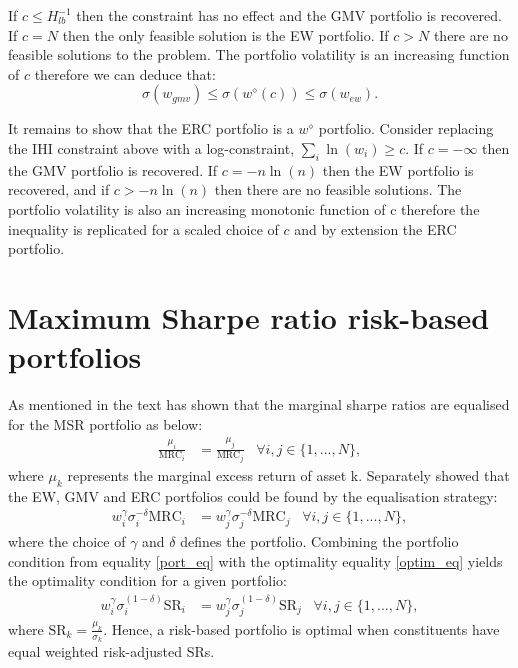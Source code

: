 \documentclass[a4paper,11pt,nocenter,bold,noupper,headcount]{mythesis}
\theoremstyle{plain}
\theoremstyle{definition}
\begin{document}
If $c \leq H^{-1}_{lb}$ then the constraint has no effect and the GMV portfolio is recovered. If $c = N$ then the only feasible solution is the EW portfolio. If $c > N$ there are no feasible solutions to the problem. The portfolio volatility is an increasing function of $c$ therefore we can deduce that: $$\sigma(w_{gmv}) \leq \sigma(w^\diamond(c)) \leq \sigma (w_{ew}).$$

It remains to show that the ERC portfolio is a $w^\diamond$ portfolio. Consider replacing the IHI constraint above with a log-constraint, $\sum_i \ln(w_i) \geq c$. If $c = - \infty$ then the GMV portfolio is recovered. If $c = -n \ln(n)$ then the EW portfolio is recovered, and if $c > -n\ln(n)$ then there are no feasible solutions. The portfolio volatility is also an increasing monotonic function of c therefore the inequality is replicated for a scaled choice of $c$ and by extension the ERC portfolio.
\section{Maximum Sharpe ratio risk-based portfolios} \label{msr_rb}

As mentioned in the text \cite{S07} has shown that the marginal sharpe ratios are equalised for the MSR portfolio as below:
\begin{align} \label{optim_eq}
\frac{\mu_i}{\text{MRC}_i} & = \frac{\mu_j}{\text{MRC}_j} \;\;\; \forall i, j \in \{1, ..., N \},
\end{align}
where $\mu_k$ represents the marginal excess return of asset k. Separately \cite{J13} showed that the EW, GMV and ERC portfolios could be found by the equalisation strategy:
\begin{align} \label{port_eq}
w_i^\gamma \sigma^{-\delta}_i \text{MRC}_i & = w_j^\gamma \sigma^{-\delta}_j \text{MRC}_j \;\;\; \forall i, j \in \{1, ..., N \},
\end{align}
where the choice of $\gamma$ and $\delta$ defines the portfolio. Combining the portfolio condition from equality \ref{port_eq} with the optimality equality \ref{optim_eq} yields the optimality condition for a given portfolio:
\begin{align}
w_i^\gamma \sigma_i^{(1- \delta)} \text{SR}_i & = w_j^\gamma \sigma_j^{(1- \delta)} \text{SR}_j \;\;\; \forall i, j \in \{1, ..., N \},
\end{align}
where $\text{SR}_k = \frac{\mu_k}{\sigma_k}$. Hence, a risk-based portfolio is optimal when constituents have equal weighted risk-adjusted SRs.
\end{document}
